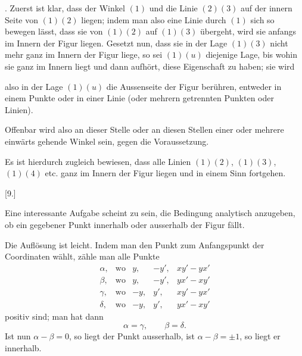 \par{}%
. Zuerst ist klar, dass der Winkel $(1)$ und die Linie $(2)(3)$ auf der innern Seite von $(1)(2)$ liegen; indem man also eine Linie durch $(1)$ sich so bewegen lässt, dass sie von $(1)(2)$ auf $(1)(3)$ übergeht, wird sie anfangs im Innern der Figur liegen. Gesetzt nun, dass sie in der Lage $(1)(3)$ nicht mehr ganz im Innern der Figur liege, so sei $(1)(u)$ diejenige Lage, bis wohin sie ganz im Innern liegt und dann aufhört, diese Eigenschaft zu haben; sie wird

\begin{center}\hfill\end{center}
\noindent also in der Lage $(1)(u)$ die Aussenseite der Figur berühren, entweder in einem Punkte oder in einer Linie (oder mehrern getrennten Punkten oder Linien).

Offenbar wird also an dieser Stelle oder an diesen Stellen einer oder mehrere einwärts gehende Winkel sein, gegen die Voraussetzung.

Es ist hierdurch zugleich bewiesen, dass alle Linien $(1)(2)$, $(1)(3)$, $(1)(4)$ etc. ganz im Innern der Figur liegen und in einem Sinn fortgehen.

\begin{center}
[9.]
\end{center}

Eine interessante Aufgabe scheint zu sein, die Bedingung analytisch anzugeben, ob ein gegebener Punkt innerhalb oder ausserhalb der Figur fällt.

Die Auflösung ist leicht. Indem man den Punkt zum Anfangspunkt der Coordinaten wählt, zähle man alle Punkte
\[
\begin{array}{cllll}
\alpha, & \text{wo} & y, & -y', & xy'-yx' \\
\beta, & \text{wo} & y, & -y', & yx'-xy' \\
\gamma, & \text{wo} & -y, & y', & xy'-yx' \\
\delta, & \text{wo} & -y, & y', & yx'-xy'
\end{array}
\]
positiv sind; man hat dann
\[
\alpha = \gamma, \qquad \beta = \delta.
\]
Ist nun $\alpha - \beta = 0$, so liegt der Punkt ausserhalb, ist $\alpha - \beta = \pm 1$, so liegt er innerhalb.
